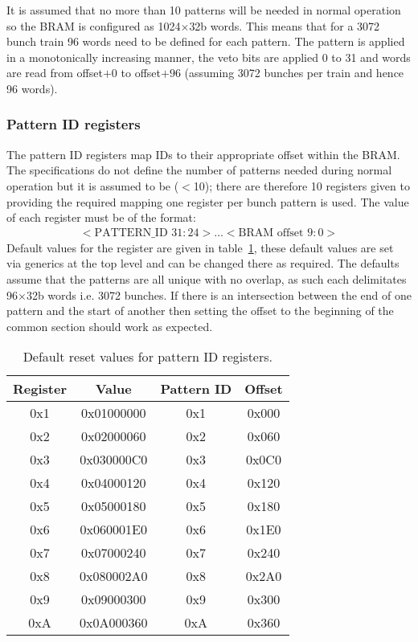 \documentclass[]{article}
\begin{document}
	It is assumed that no more than 10 patterns will be needed in normal operation so the BRAM is configured as 1024\( \times  \)32b words. This means that for a 3072 bunch train 96 words need to be defined for each pattern. The pattern is applied in a monotonically increasing manner, the veto bits are applied 0 to 31 and words are read from offset\( + 0 \) to offset\( + 96 \) (assuming 3072 bunches per train and hence 96 words). 
	

	\subsubsection{Pattern ID registers} %
	\label{sub:pattern_id_registers}
	The pattern ID registers map IDs to their appropriate offset within the BRAM. The specifications do not define the number of patterns needed during normal operation but it is assumed to be (\( < \)10); there are therefore 10 registers given to providing the required mapping one register per bunch pattern is used. The value of each register must be of the format:
	\begin{align} \label{fmt:pattern_id}
		<\text{PATTERN\_ID } 31:24>\ldots<\text{BRAM offset } 9:0> 
	\end{align}
	Default values for the register are given in table~\ref{tab:default_pattern_id_reg}, these default values are set via generics at the top level and can be changed there as required. The defaults assume that the patterns are all unique with no overlap, as such each delimitates 96\( \times \)32b words i.e. 3072 bunches. If there is an intersection between the end of one pattern and the start of another then setting the offset to the beginning of the common section should work as expected.
	\begin{table}
		\begin{center}
		\begin{tabular}{c|c|c|c}
			Register & Value      & Pattern ID & Offset \\
			\hline
			0x1      & 0x01000000 & 0x1        & 0x000  \\ 
			0x2      & 0x02000060 & 0x2        & 0x060  \\  
			0x3      & 0x030000C0 & 0x3        & 0x0C0  \\ 
			0x4      & 0x04000120 & 0x4        & 0x120  \\ 
			0x5      & 0x05000180 & 0x5        & 0x180  \\ 
			0x6      & 0x060001E0 & 0x6        & 0x1E0  \\ 
			0x7      & 0x07000240 & 0x7        & 0x240  \\ 
			0x8      & 0x080002A0 & 0x8        & 0x2A0  \\ 
			0x9      & 0x09000300 & 0x9        & 0x300  \\ 
			0xA      & 0x0A000360 & 0xA        & 0x360  \\ 
		\end{tabular}
		\end{center}
		\caption{Default reset values for pattern ID registers.}
		\label{tab:default_pattern_id_reg}
	\end{table}
\end{document}
